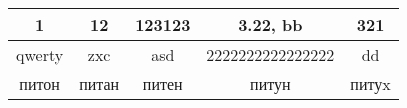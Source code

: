 \documentclass[a4paper]{report}
\begin{document}
\begin{center}
\begin{tabular}{|c|c|c|c|c|}
\hline
1 & 12 & 123123 & 3.22, bb & 321 \\
\hline
qwerty & zxc & asd & 2222222222222222 & dd \\
\hline
питон & питан & питен & питун & питуx \\
\hline
\end{tabular}
\end{center}
\end{document}

